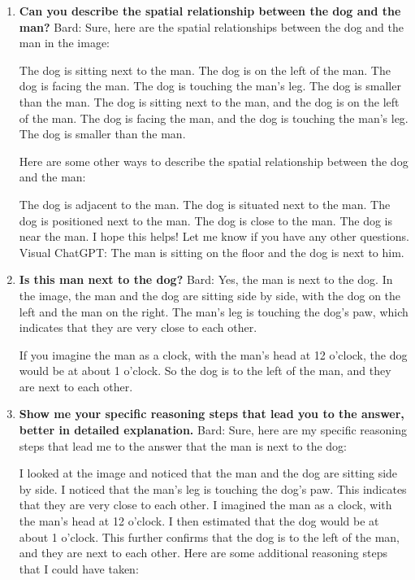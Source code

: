     \begin{enumerate}
        \item \textbf{Can you describe the spatial relationship between the dog and the man?}
        \subitem Bard: 
        Sure, here are the spatial relationships between the dog and the man in the image:
        
        The dog is sitting next to the man.
        The dog is on the left of the man.
        The dog is facing the man.
        The dog is touching the man's leg.
        The dog is smaller than the man.
        The dog is sitting next to the man, and the dog is on the left of the man. The dog is facing the man, and the dog is touching the man's leg. The dog is smaller than the man.
        
        Here are some other ways to describe the spatial relationship between the dog and the man:
        
        The dog is adjacent to the man.
        The dog is situated next to the man.
        The dog is positioned next to the man.
        The dog is close to the man.
        The dog is near the man.
        I hope this helps! Let me know if you have any other questions.
        \subitem Visual ChatGPT: The man is sitting on the floor and the dog is next to him.
        \item \textbf{Is this man next to the dog?}
        \subitem Bard: Yes, the man is next to the dog. In the image, the man and the dog are sitting side by side, with the dog on the left and the man on the right. The man's leg is touching the dog's paw, which indicates that they are very close to each other.

        If you imagine the man as a clock, with the man's head at 12 o'clock, the dog would be at about 1 o'clock. So the dog is to the left of the man, and they are next to each other.
        \item \textbf{Show me your specific reasoning steps that lead you to the answer, better in detailed explanation.}
        \subitem Bard: 
        Sure, here are my specific reasoning steps that lead me to the answer that the man is next to the dog:
        
        I looked at the image and noticed that the man and the dog are sitting side by side.
        I noticed that the man's leg is touching the dog's paw. This indicates that they are very close to each other.
        I imagined the man as a clock, with the man's head at 12 o'clock. I then estimated that the dog would be at about 1 o'clock. This further confirms that the dog is to the left of the man, and they are next to each other.
        Here are some additional reasoning steps that I could have taken:
        

\end{enumerate}
